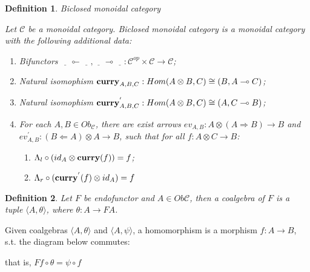 \documentclass[a4paper]{article}
\newtheorem{defin}{Definition}
\begin{document}
\begin{defin} Biclosed monoidal category

  Let $\mathcal{C}$ be a monoidal category. Biclosed monoidal category is a monoidal category with the following additional data:
  \begin{enumerate}
    \item Bifunctors $\underline{\quad} \multimapinv \underline{\quad}, \underline{\quad} \multimap \underline{\quad} : \mathcal{C}^{op} \times \mathcal{C} \to \mathcal{C}$;
    \item Natural isomophism ${\bf curry}_{A,B,C} : Hom (A \otimes B, C) \cong (B, A \multimap C)$;
    \item Natural isomophism ${\bf curry}^{'}_{A,B,C} : Hom (A \otimes B, C) \cong (A, C \multimap B)$;
    \item For each $A, B \in Ob_{\mathcal{C}}$, there are exist arrows $ev_{A,B} : A \otimes (A \Rightarrow B) \rightarrow B$ and $ev_{A,B}^{'} : (B \Leftarrow A) \otimes A \rightarrow B$,
    such that for all $f : A \otimes C \rightarrow B$:
      \begin{enumerate}
        \item $\Lambda_l \circ (id_A \otimes {\bf curry}(f)) = f$;
        \item $\Lambda_r \circ ({\bf curry}^{'}(f) \otimes id_A) = f$
      \end{enumerate}
  \end{enumerate}
\end{defin}

\begin{defin}
  Let $F$ be endofunctor and $A \in Ob\mathcal{C}$, then a coalgebra of $F$ is a tuple $\langle A, \theta \rangle$, where $\theta : A \to F A$.
\end{defin}

Given coalgebras $\langle A, \theta \rangle$ and $\langle A, \psi \rangle$, a homomorphism is a morphism $f : A \to B$, s.t. the diagram below commutes:

that is, $F f \circ \theta = \psi \circ f$
\end{document}
